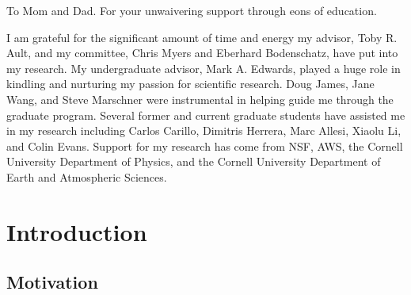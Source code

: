 \documentclass[phd,tocprelim]{cornell}
\begin{document}
\begin{dedication}
To Mom and Dad. For your unwaivering support through eons of education.
\end{dedication}

\begin{acknowledgements}
I am grateful for the significant amount of time and energy my advisor, 
Toby R. Ault, and my committee, Chris Myers and Eberhard Bodenschatz, 
have put into my research. My undergraduate advisor, Mark A. Edwards, 
played a huge role in kindling and nurturing my passion for scientific 
research. Doug James, Jane Wang, and Steve Marschner were instrumental
in helping guide me through the graduate program. Several former and 
current graduate students have assisted me in my research including 
Carlos Carillo, Dimitris Herrera, Marc Allesi, Xiaolu Li, and Colin Evans. 
Support for my research has come from NSF, AWS, the Cornell University 
Department of Physics, and the Cornell University Department of Earth 
and Atmospheric Sciences. 
\end{acknowledgements}

\contentspage
\tablelistpage
\figurelistpage

\normalspacing \setcounter{page}{1} 
\pagestyle{cornell} \addtolength{\parskip}{0.5\baselineskip}

\chapter{Introduction}

\section{Motivation}
\end{document}
